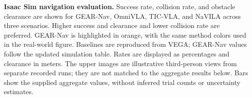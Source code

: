 \textbf{Isaac Sim navigation evaluation.}
Success rate, collision rate, and obstacle clearance are shown for GEAR-Nav,
OmniVLA, TIC-VLA, and NaVILA across three scenarios. Higher success and
clearance and lower collision rate are preferred. GEAR-Nav is highlighted in
orange, with the same method colors used in the real-world figure. Baselines
are reproduced from VEGA; GEAR-Nav values follow the updated simulation table.
Rates are displayed as percentages and clearance in meters. The upper images
are illustrative third-person views from separate recorded runs; they are not
matched to the aggregate results below. Bars show the supplied aggregate
values, without inferred trial counts or uncertainty estimates.
